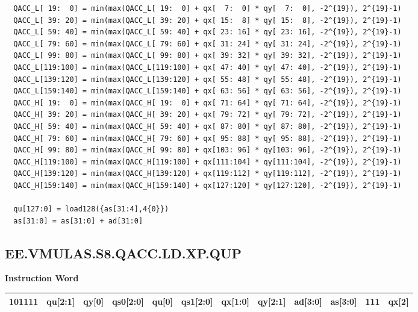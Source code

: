 \begin{lstlisting}
  QACC_L[ 19:  0] = min(max(QACC_L[ 19:  0] + qx[  7:  0] * qy[  7:  0], -2^{19}), 2^{19}-1)
  QACC_L[ 39: 20] = min(max(QACC_L[ 39: 20] + qx[ 15:  8] * qy[ 15:  8], -2^{19}), 2^{19}-1)
  QACC_L[ 59: 40] = min(max(QACC_L[ 59: 40] + qx[ 23: 16] * qy[ 23: 16], -2^{19}), 2^{19}-1)
  QACC_L[ 79: 60] = min(max(QACC_L[ 79: 60] + qx[ 31: 24] * qy[ 31: 24], -2^{19}), 2^{19}-1)
  QACC_L[ 99: 80] = min(max(QACC_L[ 99: 80] + qx[ 39: 32] * qy[ 39: 32], -2^{19}), 2^{19}-1)
  QACC_L[119:100] = min(max(QACC_L[119:100] + qx[ 47: 40] * qy[ 47: 40], -2^{19}), 2^{19}-1)
  QACC_L[139:120] = min(max(QACC_L[139:120] + qx[ 55: 48] * qy[ 55: 48], -2^{19}), 2^{19}-1)
  QACC_L[159:140] = min(max(QACC_L[159:140] + qx[ 63: 56] * qy[ 63: 56], -2^{19}), 2^{19}-1)
  QACC_H[ 19:  0] = min(max(QACC_H[ 19:  0] + qx[ 71: 64] * qy[ 71: 64], -2^{19}), 2^{19}-1)
  QACC_H[ 39: 20] = min(max(QACC_H[ 39: 20] + qx[ 79: 72] * qy[ 79: 72], -2^{19}), 2^{19}-1)
  QACC_H[ 59: 40] = min(max(QACC_H[ 59: 40] + qx[ 87: 80] * qy[ 87: 80], -2^{19}), 2^{19}-1)
  QACC_H[ 79: 60] = min(max(QACC_H[ 79: 60] + qx[ 95: 88] * qy[ 95: 88], -2^{19}), 2^{19}-1)
  QACC_H[ 99: 80] = min(max(QACC_H[ 99: 80] + qx[103: 96] * qy[103: 96], -2^{19}), 2^{19}-1)
  QACC_H[119:100] = min(max(QACC_H[119:100] + qx[111:104] * qy[111:104], -2^{19}), 2^{19}-1)
  QACC_H[139:120] = min(max(QACC_H[139:120] + qx[119:112] * qy[119:112], -2^{19}), 2^{19}-1)
  QACC_H[159:140] = min(max(QACC_H[159:140] + qx[127:120] * qy[127:120], -2^{19}), 2^{19}-1)

  qu[127:0] = load128({as[31:4],4{0}})
  as[31:0] = as[31:0] + ad[31:0]
\end{lstlisting}

\clearpage
\subsection{EE.VMULAS.S8.QACC.LD.XP.QUP}\label{instruction:EEVMULASS8QACCLDXPQUP}
\setlength\tabcolsep{6pt}
\textbf{Instruction Word} \\
\begin{tabular}{|c|c|c|c|c|c|c|c|c|c|c|c|}
	\hline
	101111 & qu[2:1] & qy[0] & qs0[2:0] & qu[0] & qs1[2:0] & qx[1:0] & qy[2:1] & ad[3:0] & as[3:0] & 111 & qx[2] \\
	\hline
\end{tabular}

